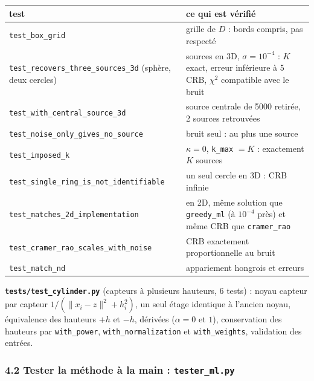 \documentclass[
  french,
]{article}
\newcounter{none} %
\begin{document}
{\def\LTcaptype{none} %
\begin{longtable}[]{@{}
  >{\raggedright\arraybackslash}p{}
  >{\raggedright\arraybackslash}p{}@{}}
\toprule\noalign{}
\begin{minipage}[b]{\linewidth}\raggedright
test
\end{minipage} & \begin{minipage}[b]{\linewidth}\raggedright
ce qui est vérifié
\end{minipage} \\
\midrule\noalign{}
\endhead
\bottomrule\noalign{}
\endlastfoot
\texttt{test\_box\_grid} & grille de \(D\) : bords compris, pas
respecté \\
\texttt{test\_recovers\_three\_sources\_3d} (sphère, deux cercles) & 3
sources en 3D, \(\sigma = 10^{-4}\) : \(K\) exact, erreur inférieure à 5
CRB, \(\chi^2\) compatible avec le bruit \\
\texttt{test\_with\_central\_source\_3d} & source centrale de 5000
retirée, 2 sources retrouvées \\
\texttt{test\_noise\_only\_gives\_no\_source} & bruit seul : au plus une
source \\
\texttt{test\_imposed\_k} & \(\kappa = 0\), \texttt{k\_max} \(= K\) :
exactement \(K\) sources \\
\texttt{test\_single\_ring\_is\_not\_identifiable} & un seul cercle en
3D : CRB infinie \\
\texttt{test\_matches\_2d\_implementation} & en 2D, même solution que
\texttt{greedy\_ml} (à \(10^{-4}\) près) et même CRB que
\texttt{cramer\_rao} \\
\texttt{test\_cramer\_rao\_scales\_with\_noise} & CRB exactement
proportionnelle au bruit \\
\texttt{test\_match\_nd} & appariement hongrois et erreurs \\
\end{longtable}
}

\textbf{\texttt{tests/test\_cylinder.py}} (capteurs à plusieurs
hauteurs, 6 tests) : noyau capteur par capteur
\(1/(\lVert x_i - z\rVert^2 + h_i^2)\), un seul étage identique à
l'ancien noyau, équivalence des hauteurs \(+h\) et \(-h\), dérivées
(\(\alpha = 0\) et \(1\)), conservation des hauteurs par
\texttt{with\_power}, \texttt{with\_normalization} et
\texttt{with\_weights}, validation des entrées.

\subsubsection{\texorpdfstring{4.2 Tester la méthode à la main :
\texttt{tester\_ml.py}}{4.2 Tester la méthode à la main : tester\_ml.py}}\label{tester-la-muxe9thode-uxe0-la-main-tester_ml.py}
\end{document}
